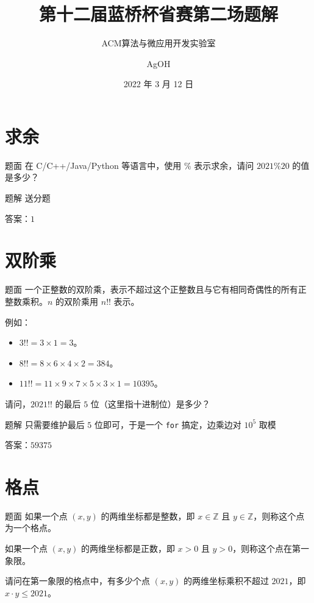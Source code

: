 \documentclass{pptt}
\title{第十二届蓝桥杯省赛第二场题解}
\author{ACM算法与微应用开发实验室 \and AgOH}
\date{2022 年 3 月 12 日}
\begin{document}
\maketitle

\section{求余}

\begin{frame}{题面}
    在 C/C++/Java/Python 等语言中，使用 $\%$ 表示求余，请问 $2021 \% 20$ 的值是多少？
\end{frame}

\begin{frame}{题解}
    送分题

    答案：$1$
\end{frame}

\section{双阶乘}

\begin{frame}{题面}
    一个正整数的双阶乘，表示不超过这个正整数且与它有相同奇偶性的所有正整数乘积。$n$ 的双阶乘用 $n!!$ 表示。

    例如：

    \begin{itemize}
        \item $3!! = 3 \times 1 = 3$。
        \item $8!! = 8 \times 6 \times 4 \times 2 = 384$。
        \item $11!! = 11 \times 9 \times 7 \times 5 \times 3 \times 1 = 10395$。
    \end{itemize}

    请问，$2021!!$ 的最后 $5$ 位（这里指十进制位）是多少？
\end{frame}

\begin{frame}{题解}
    只需要维护最后 $5$ 位即可，于是一个 \texttt{for} 搞定，边乘边对 ${10}^5$ 取模

    答案：$59375$
\end{frame}

\section{格点}

\begin{frame}{题面}
    如果一个点 $(x,y)$ 的两维坐标都是整数，即 $x \in \mathbb{Z}$ 且 $y \in \mathbb{Z}$，则称这个点为一个格点。

    如果一个点 $(x,y)$ 的两维坐标都是正数，即 $x>0$ 且 $y>0$，则称这个点在第一象限。

    请问在第一象限的格点中，有多少个点 $(x,y)$ 的两维坐标乘积不超过 $2021$，即 $x \cdot y \leq 2021$。
\end{frame}
\end{document}
